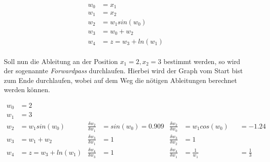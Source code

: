 \begin{minipage}{0.4\textwidth}
\begin{subequations}
\begin{align*}
w_0 & = x_1 \\
w_1 & = x_2 \\
w_2 & = w_1 sin(w_0)\\
w_3 & = w_0 + w_2 \\
w_4 & = z = w_3 + ln(w_1)\\
\end{align*}
\end{subequations}
\end{minipage}\hspace{0.1cm}


Soll nun die Ableitung an der Position $x_1 = 2, x_2 = 3$ bestimmt werden, so wird der sogenannte \textit{Forwardpass} durchlaufen. Hierbei wird der Graph vom Start bist zum Ende durchlaufen, wobei auf dem Weg die nötigen Ableitungen berechnet werden können.

\begin{subequations}
\begin{align*}
w_0 & = 2 \\
w_1 & = 3 \\
w_2 & = w_1sin(w_0) & \frac{\delta w_2}{\delta w_1} & = sin(w_0) = 0.909 & \frac{\delta w_2}{\delta w_0} &= w_1cos(w_0) & &= -1.24 \\
w_3 & = w_1 + w_2 & \frac{\delta w_3}{\delta w_1} & = 1 & \frac{\delta w_3}{\delta w_2} &= 1 \\
w_4 & = z = w_3 + ln(w_1) & \frac{\delta w_4}{\delta w_3} &= 1 & \frac{\delta w_4}{\delta w_1} &= \frac{1}{w_1} & &=\frac{1}{3}\\
\end{align*}
\end{subequations}


